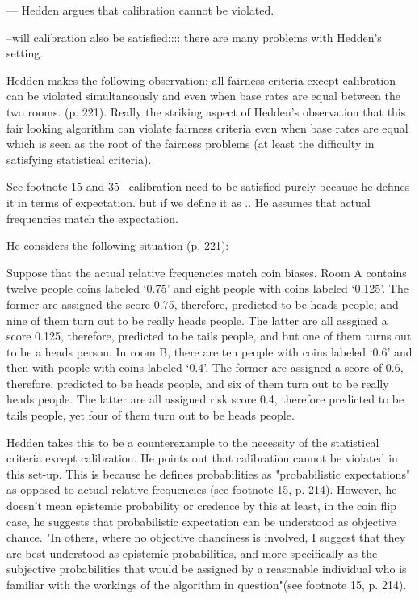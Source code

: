 \documentclass{article}
\begin{document}
--- Hedden argues that calibration cannot be violated. 

--will calibration also be satisfied:::: there are many problems with Hedden's setting.  

Hedden makes the following observation: all fairness criteria except calibration can be violated simultaneously and even when base rates are equal between the two rooms. (p. 221). Really the striking aspect of Hedden's observation that this fair looking algorithm can violate fairness criteria even when base rates are equal which is seen as the root of the fairness problems (at least the difficulty in satisfying statistical criteria).


See footnote 15 and 35-- calibration need to be satisfied purely because he defines it in terms of expectation. but if we define it as .. He assumes that actual frequencies match the expectation. 


He considers the following situation (p. 221):  

Suppose that the actual relative frequencies match coin biases. Room A contains twelve people coins labeled   `0.75' and eight people with coins labeled `0.125'. The former are assigned the score 0.75, therefore, predicted to be heads people; and nine of them turn out to be really heads people. The latter are all assgined a score 0.125, therefore, predicted to be tails people, and but one of them turns out to be a heads person. In room B, there are ten people with coins labeled `0.6' and then with people with coins labeled `0.4'. The former are assigned a score of 0.6, therefore, predicted to be heads people, and six of them turn out to be really heads people. The latter are all assigned risk score 0.4, therefore predicted to be tails people, yet four of them turn out to be heads people. 

Hedden takes this to be a counterexample to the necessity of the statistical criteria except calibration. He points out that calibration cannot be violated in this set-up. This is because he defines probabilities as "probabilistic expectations" as opposed to actual relative frequencies (see footnote 15, p. 214). However, he doesn't mean epistemic probability or credence by this at least, in the coin flip case, he suggests that probabilistic expectation can be understood as objective chance. "In others, where no objective chanciness is involved, I suggest that they are best understood as epistemic probabilities, and more specifically as the subjective probabilities that would be assigned by a reasonable individual who is familiar with the workings of the algorithm in question"(see footnote 15, p. 214). 
\end{document}
